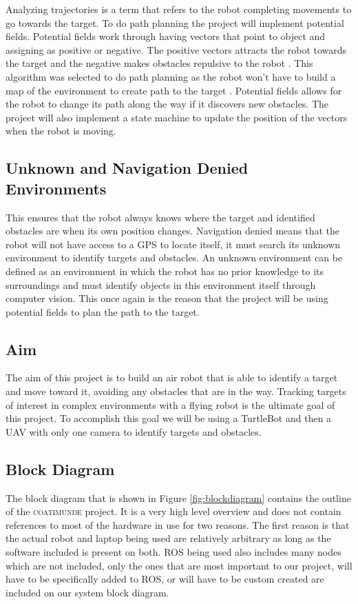 \documentclass{article}
\begin{document}
	Analyzing trajectories is a term that refers to the robot completing movements to go towards the target. To do path planning the project will implement potential fields. Potential fields work through having vectors that point to object and assigning as positive or negative. The positive vectors attracts the robot towards the target and the negative makes obstacles repulsive to the robot \cite{hwang1992potential}. This algorithm was selected to do path planning as the robot won't have to build a map of the environment to create path to the target \cite{bortoff2000path}. Potential fields allows for the robot to change its path along the way if it discovers new obstacles. The project will also implement a state machine to update the position of the vectors when the robot is moving. 

	\subsection{Unknown and Navigation Denied Environments}

	This ensures that the robot always knows where the target and identified obstacles are when its own position changes. Navigation denied means that the robot will not have access to a GPS to locate itself, it must search its unknown environment to identify targets and obstacles. An unknown environment can be defined as an environment in which the robot has no prior knowledge to its surroundings and must identify objects in this environment itself through computer vision. This once again is the reason that the project will be using potential fields to plan the path to the target. 

	\subsection{Aim}
	
	The aim of this project is to build an air robot that is able to identify a target and move toward it, avoiding any obstacles that are in the way. Tracking targets of interest in complex environments with a flying robot is the ultimate goal of this project. To accomplish this goal we will be using a TurtleBot and then a UAV with only one camera to identify targets and obstacles. 


	\subsection{Block Diagram}
	
	The block diagram that is shown in Figure \ref{fig:blockdiagram} contains the outline of the \textsc{coatimunde} project. It is a very high level overview and does not contain references to most of the hardware in use for two reasons. The first reason is that the actual robot and laptop being used are relatively arbitrary as long as the software included is present on both. ROS being used also includes many nodes which are not included, only the ones that are most important to our project, will have to be specifically added to ROS, or will have to be custom created are included on our system block diagram.
	
\end{document}
